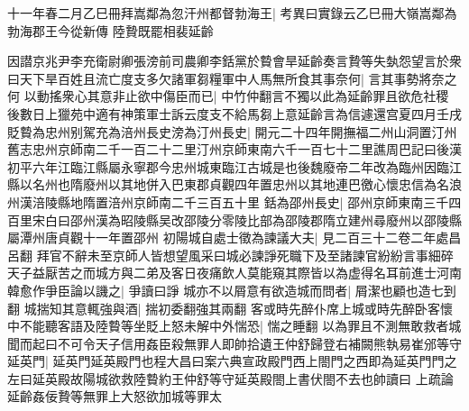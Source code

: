 十一年春二月乙巳冊拜嵩鄰為忽汗州都督勃海王|{
	考異曰實錄云乙巳冊大嶺嵩鄰為勃海郡王今從新傳}
陸贄既罷相裴延齡

因譛京兆尹李充衛尉卿張滂前司農卿李銛黨於䞇會旱延齡奏言贄等失埶怨望言於衆曰天下旱百姓且流亡度支多欠諸軍芻糧軍中人馬無所食其事奈何|{
	言其事勢將奈之何}
以動搖衆心其意非止欲中傷臣而已|{
	中竹仲翻言不獨以此為延齡罪且欲危社稷}
後數日上獵苑中適有神策軍士訴云度支不給馬芻上意延齡言為信遽還宫夏四月壬戌貶䞇為忠州别駕充為涪州長史滂為汀州長史|{
	開元二十四年開撫福二州山洞置汀州舊志忠州京師南二千一百二十二里汀州京師東南六千一百七十二里譙周巴記曰後漢初平六年江臨江縣屬永寧郡今忠州城東臨江古城是也後魏廢帝二年改為臨州因臨江縣以名州也隋廢州以其地併入巴東郡貞觀四年置忠州以其地連巴徼心懷忠信為名浪州漢涪陵縣地隋置涪州京師南二千三百五十里}
銛為邵州長史|{
	邵州京師東南三千四百里宋白曰邵州漢為昭陵縣吴改邵陵分零陵比部為邵陵郡隋立建州尋廢州以邵陵縣屬潭州唐貞觀十一年置邵州}
初陽城自處士徵為諫議大夫|{
	見二百三十二卷二年處昌呂翻}
拜官不辭未至京師人皆想望風采曰城必諫諍死職下及至諸諫官紛紛言事細碎天子益厭苦之而城方與二弟及客日夜痛飲人莫能窺其際皆以為虚得名耳前進士河南韓愈作爭臣論以譏之|{
	爭讀曰諍}
城亦不以屑意有欲造城而問者|{
	屑潔也顧也造七到翻}
城揣知其意輒強與酒|{
	揣初委翻強其兩翻}
客或時先醉仆席上城或時先醉卧客懷中不能聽客語及陸䞇等坐貶上怒未解中外惴恐|{
	惴之睡翻}
以為罪且不測無敢救者城聞而起曰不可令天子信用姦臣殺無罪人即帥拾遺王仲舒歸登右補闕熊執易崔邠等守延英門|{
	延英門延英殿門也程大昌曰案六典宣政殿門西上閤門之西即為延英門門之左曰延英殿故陽城欲救陸䞇約王仲舒等守延英殿閤上書伏閤不去也帥讀曰}
上疏論延齡姦佞贄等無罪上大怒欲加城等罪太

